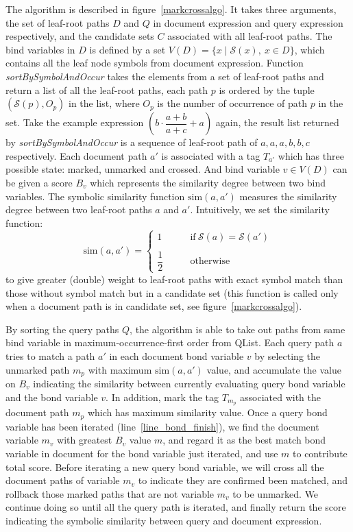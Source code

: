 The algorithm is described in figure~\ref{markcrossalgo}. It takes three arguments, the set of leaf-root paths $D$ and $Q$ in document expression and query expression respectively, and the candidate sets $C$ associated with all leaf-root paths. 
The bind variables in $D$ is defined by a set $V(D) = \{x \mid \mathcal{S}(x),\ x \in D\}$, which contains all the leaf node symbols from document expression.
Function \textit{sortBySymbolAndOccur} takes the elements from a set of leaf-root paths and return a list of all the leaf-root paths, each path $p$ is ordered by the tuple $(\mathcal{S}(p), O_p)$ in the list, where $O_p$ is the number of occurrence of path $p$ in the set. 
Take the example expression $\left(b \cdot \dfrac{a+b}{a+c} + a\right)$ again, the result list returned by \textit{sortBySymbolAndOccur} is a sequence of leaf-root path of $a,a,a,b,b,c$ respectively.
Each document path $a'$ is associated with a tag $T_{a'}$ which has three possible state: marked, unmarked and crossed. And bind variable $v \in V(D)$ can be given a score $B_v$ which represents the similarity degree between two bind variables. 
The symbolic similarity function $\mathrm{sim}(a,a')$ measures the similarity degree between two leaf-root paths $a$ and $a'$. 
Intuitively, we set the similarity function:
$$
\mathrm{sim}(a,a') = 
\left\{
\begin{array}{ll}
1    &\qquad \mathrm{if}\  \mathcal{S}(a) = \mathcal{S}(a')
\\
\\
\dfrac 1 2  &\qquad \mathrm{otherwise}
\end{array}
\right.
$$
to give greater (double) weight to leaf-root paths with exact symbol match than those without symbol match but in a candidate set
(this function is called only when a document path is in candidate set, see figure~\ref{markcrossalgo}).

By sorting the query paths $Q$, the algorithm is able to take out paths from same bind variable in maximum-occurrence-first order from QList. 
Each query path $a$ tries to match a path $a'$ in each document bond variable $v$ by selecting the unmarked path $m_p$ with maximum $\mathrm{sim}(a,a')$ value, and accumulate the value on $B_v$ indicating the similarity between currently evaluating query bond variable and the bond variable $v$.
In addition, mark the tag $T_{m_p}$ associated with the document path $m_p$ which has maximum similarity value.
Once a query bond variable has been iterated (line~\ref{line_bond_finish}),
we find the document variable $m_v$ with greatest $B_v$ value $m$, and regard it as the best match bond variable in document for the bond variable just iterated, and use $m$ to contribute total score.
Before iterating a new query bond variable, we will cross all the document paths of variable $m_v$ to indicate they are confirmed been matched, 
and rollback those marked paths that are not variable $m_v$ to be unmarked.
We continue doing so until all the query path is iterated, and finally return the score indicating the symbolic similarity between query and document expression.

